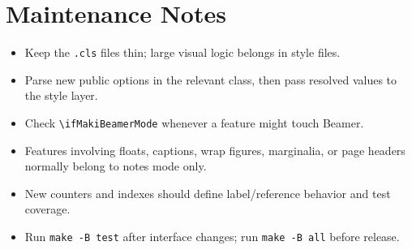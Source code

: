 \documentclass[a4paper,11pt]{ltxdoc}
\newcommand{\mfile}[1]{\texttt{#1}}
\newcommand{\mcmd}[1]{\texttt{\textbackslash#1}}
\begin{document}
\section{Maintenance Notes}

\begin{itemize}
\item Keep the \mfile{.cls} files thin; large visual logic belongs in style files.
\item Parse new public options in the relevant class, then pass resolved values to the style layer.
\item Check \mcmd{ifMakiBeamerMode} whenever a feature might touch Beamer.
\item Features involving floats, captions, wrap figures, marginalia, or page headers normally belong to notes mode only.
\item New counters and indexes should define label/reference behavior and test coverage.
\item Run \verb|make -B test| after interface changes; run \verb|make -B all| before release.
\end{itemize}
\end{document}
